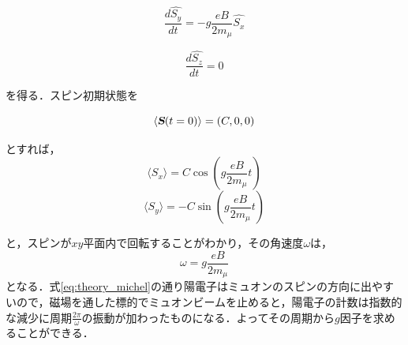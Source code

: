 \begin{equation}
\frac{d\hat{S_y}}{dt} = - g \frac{eB}{2m_\mu}\hat{S_x} 
\end{equation} 

\begin{equation}
\frac{d\hat{S_z}}{dt} = 0 
\end{equation} 

を得る．スピン初期状態を

\begin{equation}
\langle \textsl{\textbf {S}}(t=0)\rangle = (C,0,0)
\end{equation} 

とすれば，
\begin{equation}
\langle S_x \rangle= C\cos{(g\frac{eB}{2m_\mu}t)}
\end{equation}
\begin{equation}
\langle S_y \rangle= -C\sin{(g\frac{eB}{2m_\mu}t)}
\end{equation}

と，スピンが$xy$平面内で回転することがわかり，その角速度$\omega$は，
\begin{equation}
\omega = g\frac{eB}{2m_\mu}
\end{equation}
となる．式\eqref{eq:theory_michel}の通り陽電子はミュオンのスピンの方向に出やすいので，磁場を通した標的でミュオンビームを止めると，陽電子の計数は指数的な減少に周期$\frac{2\pi}{\omega}$の振動が加わったものになる．よってその周期から$g$因子を求めることができる．
